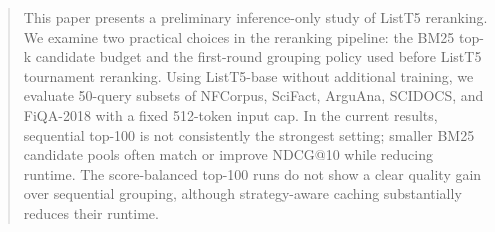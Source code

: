 \begin{abstract}
This paper presents a preliminary inference-only study of ListT5 reranking.
We examine two practical choices in the reranking pipeline: the BM25 top-k candidate budget and the first-round grouping policy used before ListT5 tournament reranking.
Using ListT5-base without additional training, we evaluate 50-query subsets of NFCorpus, SciFact, ArguAna, SCIDOCS, and FiQA-2018 with a fixed 512-token input cap.
In the current results, sequential top-100 is not consistently the strongest setting; smaller BM25 candidate pools often match or improve NDCG@10 while reducing runtime.
The score-balanced top-100 runs do not show a clear quality gain over sequential grouping, although strategy-aware caching substantially reduces their runtime.
\end{abstract}
